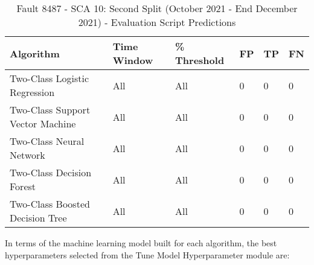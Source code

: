 \begin{table}[!ht]
    \centering
    \begin{tabular}{|l|l|l|l|l|l|}
    \hline
        Algorithm & Time Window & \% Threshold & FP & TP & FN \\ \hline
        Two-Class Logistic Regression & All & All & 0 & 0 & 0 \\ \hline
        Two-Class Support Vector Machine & All & All & 0 & 0 & 0 \\ \hline
        Two-Class Neural Network & All & All & 0 & 0 & 0 \\ \hline
        Two-Class Decision Forest & All & All & 0 & 0 & 0 \\ \hline
        Two-Class Boosted Decision Tree & All & All & 0 & 0 & 0 \\ \hline
    \end{tabular}
    \caption{Fault 8487 - SCA 10: Second Split (October 2021 - End December 2021) - Evaluation Script Predictions}
    \label{9112_SCA34_1st}
\end{table}

In terms of the machine learning model built for each algorithm, the best hyperparameters selected from the Tune Model Hyperparameter module are:

